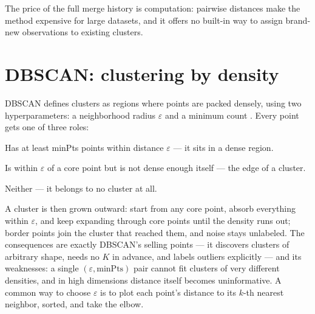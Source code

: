 The price of the full merge history is computation: pairwise distances make the method expensive for large datasets, and it offers no built-in way to assign brand-new observations to existing clusters.

\section{DBSCAN: clustering by density}
\label{sec:dbscan}

DBSCAN defines clusters as regions where points are packed densely, using two hyperparameters: a neighborhood radius $\varepsilon$ and a minimum count . Every point gets one of three roles:

\begin{description}[leftmargin=1.05in,style=nextline]
  \item[Core point] Has at least minPts points within distance $\varepsilon$ --- it sits in a dense region.
  \item[Border point] Is within $\varepsilon$ of a core point but is not dense enough itself --- the edge of a cluster.
  \item[Noise point] Neither --- it belongs to no cluster at all.
\end{description}

\begin{mlfigure}
\end{mlfigure}

A cluster is then grown outward: start from any core point, absorb everything within $\varepsilon$, and keep expanding through core points until the density runs out; border points join the cluster that reached them, and noise stays unlabeled. The consequences are exactly DBSCAN's selling points --- it discovers clusters of arbitrary shape, needs no $K$ in advance, and labels outliers explicitly --- and its weaknesses: a single $(\varepsilon,\text{minPts})$ pair cannot fit clusters of very different densities, and in high dimensions distance itself becomes uninformative. A common way to choose $\varepsilon$ is to plot each point's distance to its $k$-th nearest neighbor, sorted, and take the elbow.


